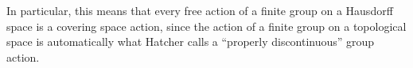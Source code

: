 \begin{homework}[e]
\begin{prf}
    In particular, this means that every free action of a finite group on a Hausdorff space is a covering space action, since the action of a finite group on a topological space is automatically what Hatcher calls a ``properly discontinuous'' group action.
  \end{prf}
\end{homework}

